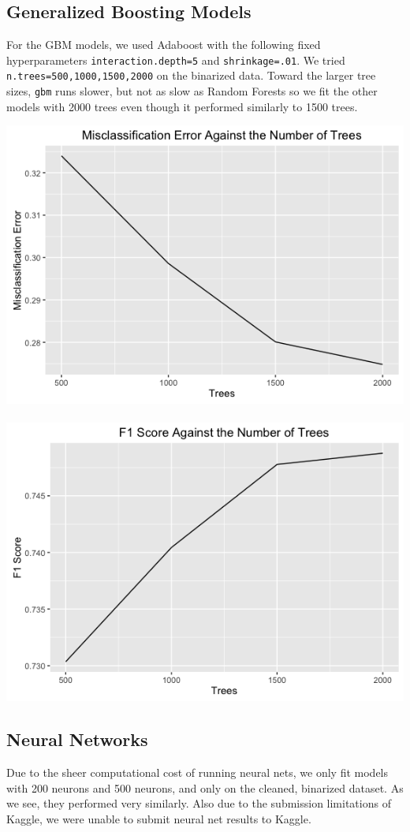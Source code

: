 \documentclass{article}
\begin{document}
\subsection{Generalized Boosting Models}
For the GBM models, we used Adaboost with the following fixed hyperparameters \texttt{interaction.depth=5} and \texttt{shrinkage=.01}. We tried \texttt{n.trees=500,1000,1500,2000} on the binarized data. Toward the larger tree sizes, \texttt{gbm} runs slower, but not as slow as Random Forests so we fit the other models with 2000 trees even though it performed similarly to 1500 trees. \\

\centerline{\includegraphics[scale=.29]{diagrams/4gbm.png} ~~~~~~~~~~~~~~~ \includegraphics[scale=.29]{diagrams/5gbm.png}}

\subsection{Neural Networks}
Due to the sheer computational cost of running neural nets, we only fit models with 200 neurons and 500 neurons, and only on the cleaned, binarized dataset. As we see, they performed very similarly. Also due to the submission limitations of Kaggle, we were unable to submit neural net results to Kaggle. \\
\end{document}
